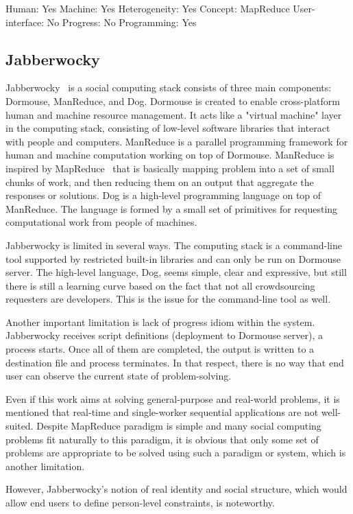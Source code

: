 Human: Yes
Machine: Yes
Heterogeneity: Yes
Concept: MapReduce
User-interface: No
Progress: No
Programming: Yes

\subsection{Jabberwocky}
Jabberwocky~\cite{Ahmad2011} is a social computing stack consists of three 
main components: Dormouse, ManReduce, and Dog. Dormouse is created to 
enable cross-platform human and machine resource management. It acts like a 
"virtual machine" layer in the computing stack, consisting of low-level software 
libraries that interact with people and computers. ManReduce is a parallel 
programming framework for human and machine computation working on top 
of Dormouse. ManReduce is inspired by MapReduce~\cite{Dean2008} that is 
basically mapping problem into a set of small chunks of work, and then reducing 
them on an output that aggregate the responses or solutions. Dog is a high-level 
programming language on top of ManReduce. The language is formed by a small 
set of primitives for requesting computational work from people of machines. 

Jabberwocky is limited in several ways. The computing stack is a command-line 
tool supported by restricted built-in libraries and can only be run on Dormouse server. 
The high-level language, Dog, seems simple, clear and expressive, but still there is 
still a learning curve based on the fact that not all crowdsourcing requesters are 
developers. This is the issue for the command-line tool as well.

Another important limitation is lack of progress idiom within the system. 
Jabberwocky receives script definitions (deployment to Dormouse server), 
a process starts. Once all of them are completed, the output is written to a destination 
file and process terminates. In that respect, there is no way that end user can 
observe the current state of problem-solving.

Even if this work aims at solving general-purpose and real-world problems, 
it is mentioned that real-time and single-worker sequential applications are not 
well-suited. Despite MapReduce paradigm is simple and many social computing 
problems fit naturally to this paradigm, it is obvious that only some set of problems are 
appropriate to be solved using such a paradigm or system, which is another limitation. 

However, Jabberwocky's notion of real identity and social structure, 
which would allow end users to define person-level constraints, is noteworthy.


